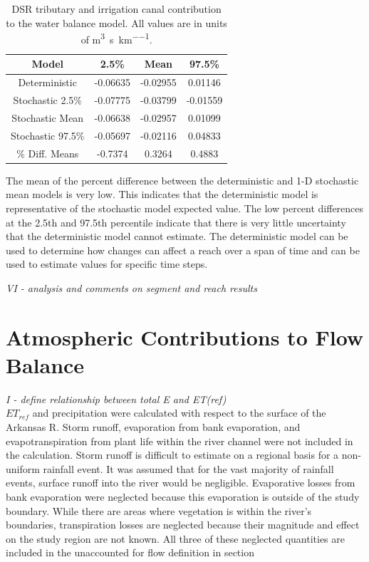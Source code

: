 \begin{linenumbers}
\begin{table}[htbp]
\centering
\caption[DSR tributary and irrigation canal contribution to the water balance model.]{DSR tributary and irrigation canal contribution to the water balance model.  All values are in units of \si{\cubic\meter\per\second\per\kilo\meter}.}
\label{tab:DSRWaterFlow}
\begin{tabular}{c|ccc}
	\toprule
	Model& 2.5\% & Mean & 97.5\% \\
	\midrule
	\midrule
	Deterministic    & -0.06635&	-0.02955&	0.01146\\
	\midrule                                            
	Stochastic 2.5\% & -0.07775	&-0.03799	&-0.01559\\
	Stochastic Mean  & -0.06638	&-0.02957	&0.01099 \\
	Stochastic 97.5\%& -0.05697	&-0.02116	&0.04833 \\
	\midrule                                            
	\% Diff. Means &	 -0.7374&	0.3264&	0.4883\\
	\bottomrule
\end{tabular}
\end{table}

The mean of the percent difference between the deterministic and 1-D stochastic mean models is very low.  This indicates that the deterministic model is representative of the stochastic model expected value.  The low percent differences at the 2.5th and 97.5th percentile indicate that there is very little uncertainty that the deterministic model cannot estimate.  The deterministic model can be used to determine how changes can affect a reach over a span of time and can be used to estimate values for specific time steps.

\emph{VI - analysis and comments on segment and reach results}\\

\clearpage{}
\section{Atmospheric Contributions to Flow Balance}
\label{sec:AtmosphericContributions}

\emph{I - define relationship between total E and ET(ref)}\\

$ET_{ref}$ and precipitation were calculated with respect to the surface of the Arkansas R.  Storm runoff, evaporation from bank evaporation, and evapotranspiration from plant life within the river channel were not included in the calculation.  Storm runoff is difficult to estimate on a regional basis for a non-uniform rainfall event.  It was assumed that for the vast majority of rainfall events, surface runoff into the river would be negligible.  Evaporative losses from bank evaporation were neglected because this evaporation is outside of the study boundary.  While there are areas where vegetation is within the river's boundaries, transpiration losses are neglected because their magnitude and effect on the study region are not known.  All three of these neglected quantities are included in the unaccounted for flow definition in section


\end{linenumbers}
